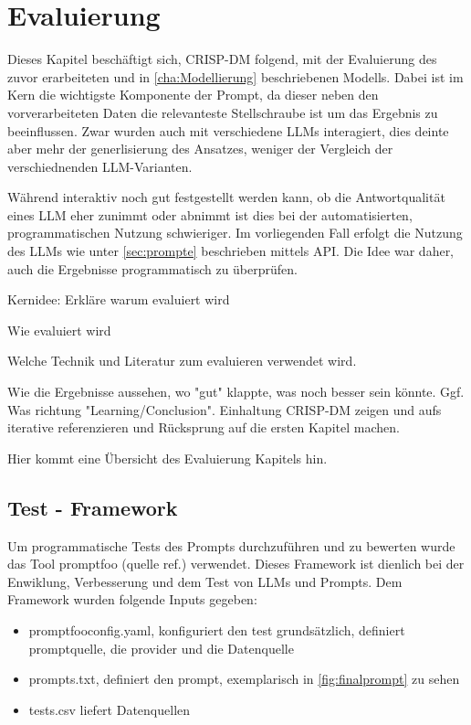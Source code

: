 
\chapter{Evaluierung}
\label{cha:eval}

Dieses Kapitel beschäftigt sich, \ac{CRISP-DM} folgend, mit der Evaluierung des zuvor erarbeiteten und in \autoref{cha:Modellierung} beschriebenen Modells. Dabei ist im Kern die wichtigste Komponente der Prompt, da dieser neben den vorverarbeiteten Daten die relevanteste Stellschraube ist um das Ergebnis zu beeinflussen. Zwar wurden auch mit verschiedene LLMs interagiert, dies deinte aber mehr der generlisierung des Ansatzes, weniger der Vergleich der verschiednenden \ac{LLM}-Varianten.

Während interaktiv noch gut festgestellt werden kann, ob die Antwortqualität eines \ac{LLM} eher zunimmt oder abnimmt ist dies bei der automatisierten, programmatischen Nutzung schwieriger. Im vorliegenden Fall erfolgt die Nutzung des \ac{LLM}s wie unter \autoref{sec:prompte} beschrieben mittels \ac{API}. Die Idee war daher, auch die Ergebnisse programmatisch zu überprüfen.



Kernidee: Erkläre warum evaluiert wird

Wie evaluiert wird

Welche Technik und Literatur zum evaluieren verwendet wird.

Wie die Ergebnisse aussehen, wo "gut" klappte, was noch besser sein könnte. Ggf. Was richtung "Learning/Conclusion". Einhaltung CRISP-DM zeigen und aufs iterative referenzieren und Rücksprung auf die ersten Kapitel machen.

Hier kommt eine Übersicht des Evaluierung Kapitels hin.

\section{Test - Framework}
\label{sec:Framework}
Um programmatische Tests des Prompts durchzuführen und zu bewerten wurde das Tool promptfoo (quelle ref.) verwendet. Dieses Framework ist dienlich bei der Enwiklung, Verbesserung und dem Test von \ac{LLM}s und Prompts. Dem Framework wurden folgende Inputs gegeben:

\begin{itemize}
    \item promptfooconfig.yaml, konfiguriert den test grundsätzlich, definiert promptquelle, die provider und die Datenquelle
    \item prompts.txt, definiert den prompt, exemplarisch in \autoref{fig:finalprompt} zu sehen
    \item tests.csv liefert Datenquellen
\end{itemize}

